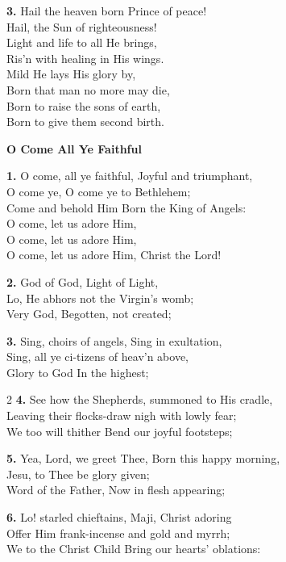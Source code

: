 \documentclass[a5paper,12pt]{article}
\begin{document}
\textbf{3.} Hail the heaven born Prince of peace!\\
Hail, the Sun of righteousness!\\
Light and life to all He brings,\\
Ris'n with healing in His wings.\\
Mild He lays His glory by,\\
Born that man no more may die,\\
Born to raise the sons of earth,\\
Born to give them second birth.

\newpage

\begin{center}{\Large\bfseries O Come All Ye Faithful}\end{center}
\vspace{0.3em}
\textbf{1.} O come, all ye faithful, Joyful and triumphant,\\
O come ye, O come ye to Bethlehem;\\
Come and behold Him Born the King of Angels:\\
O come, let us adore Him,\\
O come, let us adore Him,\\
O come, let us adore Him, Christ the Lord!

\textbf{2.} God of God, Light of Light,\\
Lo, He abhors not the Virgin's womb;\\
Very God, Begotten, not created;

\textbf{3.} Sing, choirs of angels, Sing in exultation,\\
Sing, all ye ci-tizens of heav'n above,\\
Glory to God In the highest;

\begin{multicols}{2}
\small
\textbf{4.} See how the Shepherds, summoned to His cradle,\\
Leaving their flocks-draw nigh with lowly fear;\\
We too will thither Bend our joyful footsteps;

\textbf{5.} Yea, Lord, we greet Thee, Born this happy morning,\\
Jesu, to Thee be glory given;\\
Word of the Father, Now in flesh appearing;

\textbf{6.} Lo! starled chieftains, Maji, Christ adoring\\
Offer Him frank-incense and gold and myrrh;\\
We to the Christ Child Bring our hearts' oblations:

\end{multicols}
\newpage
\end{document}
